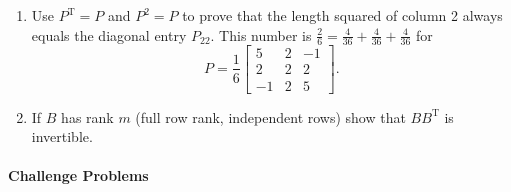 \documentclass[14pt, a4paper]{article}
\begin{document}
\begin{enumerate}[resume]
    \item Use $P^{\mathrm{T}} = P$ and $P^2 = P$ to prove that the length squared of column 2 always equals the diagonal entry $P_{22}$. This number is $\frac{2}{6} = \frac{4}{36} + \frac{4}{36} + \frac{4}{36}$ for
          \[
              P = \frac{1}{6} \begin{bmatrix} 5 & 2 & -1 \\ 2 & 2 & 2 \\ -1 & 2 & 5 \end{bmatrix}.
          \]

    \item If $B$ has rank $m$ (full row rank, independent rows) show that $BB^{\mathrm{T}}$ is invertible.
\end{enumerate}

\paragraph{Challenge Problems}
\end{document}
